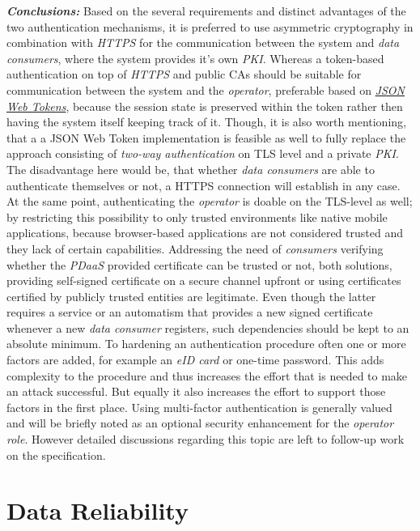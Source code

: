 \documentclass[12pt,english,a4paper,titlepage,cleardoublepage=empty,dottedtoc]{report}
\begin{document}
\emph{\textbf{Conclusions:}} Based on the several requirements and
distinct advantages of the two authentication mechanisms, it is
preferred to use asymmetric cryptography in combination with
\emph{HTTPS} for the communication between the system and \emph{data
consumers}, where the system provides it's own \emph{PKI}. Whereas a
token-based authentication on top of \emph{HTTPS} and public CAs should
be suitable for communication between the system and the
\emph{operator}, preferable based on
\emph{\protect\hyperlink{link_jwt}{JSON Web Tokens}}, because the
session state is preserved within the token rather then having the
system itself keeping track of it. Though, it is also worth mentioning,
that a a JSON Web Token implementation is feasible as well to fully
replace the approach consisting of \emph{two-way authentication} on TLS
level and a private \emph{PKI}. The disadvantage here would be, that
whether \emph{data consumers} are able to authenticate themselves or
not, a HTTPS connection will establish in any case. At the same point,
authenticating the \emph{operator} is doable on the TLS-level as well;
by restricting this possibility to only trusted environments like native
mobile applications, because browser-based applications are not
considered trusted and they lack of certain capabilities. Addressing the
need of \emph{consumers} verifying whether the \emph{PDaaS} provided
certificate can be trusted or not, both solutions, providing self-signed
certificate on a secure channel upfront or using certificates certified
by publicly trusted entities are legitimate. Even though the latter
requires a service or an automatism that provides a new signed
certificate whenever a new \emph{data consumer} registers, such
dependencies should be kept to an absolute minimum. To hardening an
authentication procedure often one or more factors are added, for
example an \emph{eID card} or one-time password. This adds complexity to
the procedure and thus increases the effort that is needed to make an
attack successful. But equally it also increases the effort to support
those factors in the first place. Using multi-factor authentication is
generally valued and will be briefly noted as an optional security
enhancement for the \emph{operator role}. However detailed discussions
regarding this topic are left to follow-up work on the specification.

\hypertarget{data-reliability}{\section{Data
Reliability}\label{data-reliability}}
\end{document}
